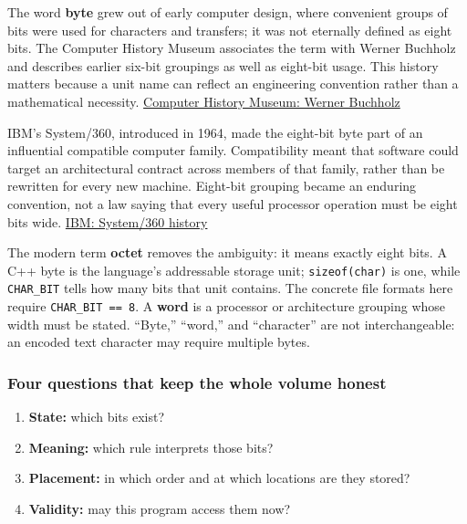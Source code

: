 The word \textbf{byte} grew out of early computer design, where convenient groups of bits were used for characters and transfers; it was not eternally defined as eight bits. The Computer History Museum associates the term with Werner Buchholz and describes earlier six-bit groupings as well as eight-bit usage. This history matters because a unit name can reflect an engineering convention rather than a mathematical necessity. \href{https://www.computerhistory.org/tdih/october/24/}{Computer History Museum: Werner Buchholz}

IBM's System/360, introduced in 1964, made the eight-bit byte part of an influential compatible computer family. Compatibility meant that software could target an architectural contract across members of that family, rather than be rewritten for every new machine. Eight-bit grouping became an enduring convention, not a law saying that every useful processor operation must be eight bits wide. \href{https://www.ibm.com/history/system-360}{IBM: System/360 history}

The modern term \textbf{octet} removes the ambiguity: it means exactly eight bits. A C++ byte is the language's addressable storage unit; \texttt{sizeof(char)} is one, while \texttt{CHAR\_BIT} tells how many bits that unit contains. The concrete file formats here require \texttt{CHAR\_BIT\ ==\ 8}. A \textbf{word} is a processor or architecture grouping whose width must be stated. ``Byte,'' ``word,'' and ``character'' are not interchangeable: an encoded text character may require multiple bytes.

\subsubsection{Four questions that keep the whole volume honest}\label{01-foundations-i-ch001-four-questions-that-keep-the-whole-volume-honest}

\hypertarget{01-foundations-i-ch001-four-questions-that-keep-the-whole-volume-honest}{}

\begin{enumerate}
\def\labelenumi{\arabic{enumi}.}
\tightlist
\item
  \textbf{State:} which bits exist?
\item
  \textbf{Meaning:} which rule interprets those bits?
\item
  \textbf{Placement:} in which order and at which locations are they stored?
\item
  \textbf{Validity:} may this program access them now?
\end{enumerate}

